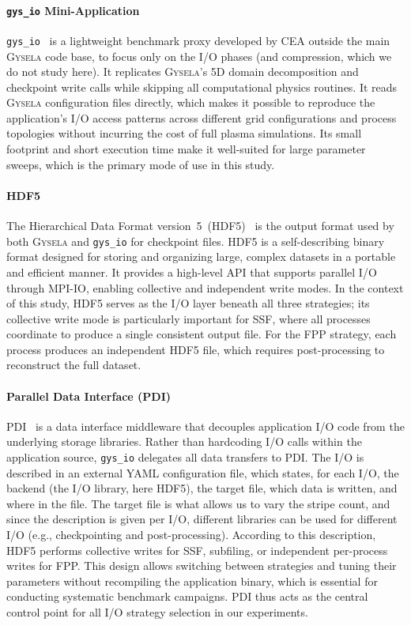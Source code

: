 \paragraph{\texttt{gys\_io} Mini-Application}
\label{sec:gysio}
\texttt{gys\_io}~\cite{gysela_miniapp_io} is a lightweight benchmark proxy
developed by CEA outside the main \textsc{Gysela} code base, to focus only on the I/O
phases (and compression, which we do not study here). It replicates \textsc{Gysela}'s
5D domain decomposition and checkpoint write calls while skipping all computational
physics routines. It reads \textsc{Gysela} configuration files directly, which makes
it possible to reproduce the application's I/O access patterns across different grid
configurations and process topologies without incurring the cost of full plasma
simulations. Its small footprint and short execution time make it well-suited for
large parameter sweeps, which is the primary mode of use in this study.

\paragraph{HDF5}
\label{sec:hdf5}
The Hierarchical Data Format version~5~(HDF5)~\cite{folk2011overview} is the output format used
by both \textsc{Gysela} and \texttt{gys\_io} for checkpoint files. HDF5 is a
self-describing binary format designed for storing and organizing large, complex
datasets in a portable and efficient manner. It provides a high-level API that
supports parallel I/O through MPI-IO, enabling collective and independent write
modes. In the context of this study, HDF5 serves as the I/O layer beneath all three
strategies; its collective write mode is particularly important for
SSF, where all processes coordinate to produce a single consistent output file. For the
FPP strategy, each process produces an independent HDF5 file, which requires
post-processing to reconstruct the full dataset.

\paragraph{Parallel Data Interface (PDI)}
\label{sec:pdi}
PDI~\cite{roussel2017pdi} is a data interface middleware that decouples application I/O code
from the underlying storage libraries. Rather than hardcoding I/O calls within the
application source, \texttt{gys\_io} delegates all data transfers to PDI. The I/O is
described in an external YAML configuration file, which states, for each I/O, the
backend (the I/O library, here HDF5), the target file, which data is written, and
where in the file. The target file is what allows us to vary the stripe count, and since
the description is given per I/O, different libraries can be used for different I/O
(e.g., checkpointing and post-processing). According to this description, HDF5
performs collective writes for SSF, subfiling, or independent per-process writes for
FPP. This design allows switching between strategies
and tuning their parameters without recompiling the application binary, which is
essential for conducting systematic benchmark campaigns. PDI thus acts as the
central control point for all I/O strategy selection in our experiments.

